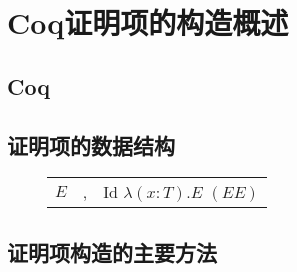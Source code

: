 \chapter{Coq证明项的构造概述}
\label{chap:proof}

\section{Coq}
\section{证明项的数据结构}
\begin{figure}[!htbp]
  \centering
  \begin{tabular}[rcl]{rcl}
    $E$ & \sep{} & Id \deli{} $\lambda(x:T).E$ \deli{} $(E E)$
  \end{tabular}
\end{figure}

\section{证明项构造的主要方法}
